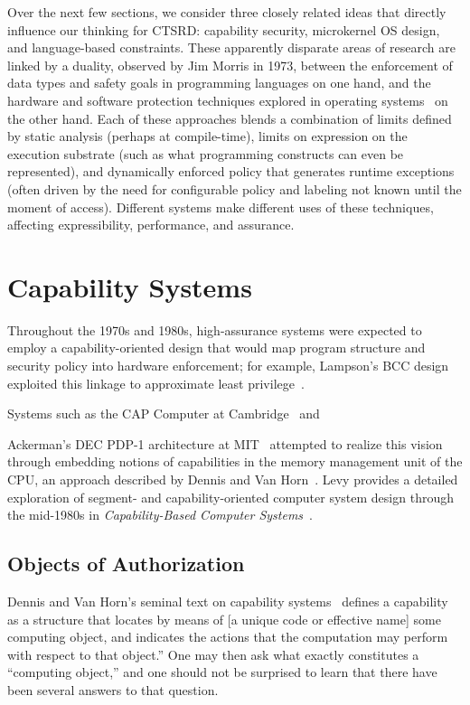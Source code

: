 Over the next few sections, we consider three closely related ideas that directly influence
our thinking for CTSRD: capability security, microkernel OS design, and
language-based constraints.
These apparently disparate areas of research are linked by a duality,
observed by Jim Morris
in 1973, between the enforcement of data types and safety goals in programming languages on one hand, 
and the hardware and software protection techniques explored in operating
systems~\cite{morris:protectionprogramming} on the other hand.
Each of these approaches blends a combination of limits defined by static analysis
(perhaps at compile-time), limits on expression on the execution substrate (such as what
programming constructs can even be represented), and dynamically enforced policy that generates
runtime exceptions (often driven by the need for configurable policy and labeling not known
until the moment of access).
Different systems make different uses of these techniques, affecting expressibility,
performance, and assurance.

\section{Capability Systems} %

Throughout the 1970s and 1980s, high-assurance systems were expected
to employ a capability-oriented design that would map program
structure and security policy into hardware enforcement; for example,
Lampson's BCC design exploited this linkage to approximate least
privilege~\cite{lampson:dynamicprotection,lampson:protection}.

Systems such as the CAP Computer at Cambridge~\cite{WilkesNeedham79} and

Ackerman's DEC PDP-1 architecture at MIT~\cite{ackerman:multiprocessing}
attempted to realize this vision through embedding notions of capabilities in
the memory management unit of the CPU, an approach described by Dennis and Van
Horn~\cite{dennis:semantics}.  Levy provides a detailed exploration of segment-
and capability-oriented computer system design through the mid-1980s in {\em
Capability-Based Computer Systems}~\cite{levy:capabilities}.

\subsection{Objects of Authorization}

Dennis and Van Horn's seminal text on capability
systems~\cite{dennis:semantics} defines a capability as a structure that
locates by means of [a unique code or effective name] some computing object,
and indicates the actions that the computation may perform with respect to that
object.'' One may then ask what exactly constitutes a ``computing object,''
and one should not be surprised to learn that there have been several answers
to that question.

